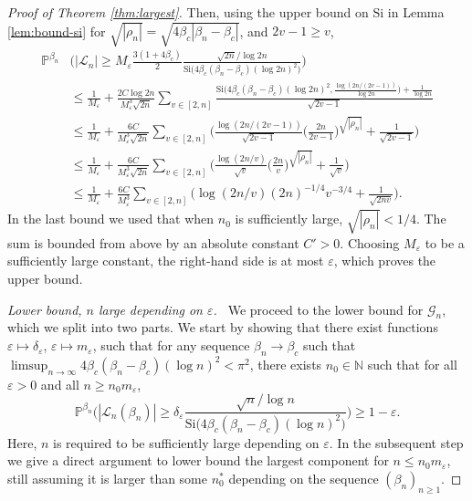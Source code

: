 \documentclass[a4paper, a4wide, 10pt, reqno]{amsart}
\theoremstyle{plain}
\theoremstyle{definition}
\numberwithin{equation}{section}
\newcommand{\N}{{\mathbb N}}
\newcommand{\Prob}{\mathbb{P}}
\newcommand\eps{\varepsilon}
\newcommand{\sG}{{\mathscr G}}
\newcommand{\sL}{{\mathscr L}}
\newcommand{\Si}{{\mathrm{Si}}}
\begin{document}
\begin{proof}[Proof of Theorem \ref{thm:largest}]
Then, using the upper bound on $\Si$ in Lemma \ref{lem:bound-si} for $\sqrt{|\rho_n|}=\sqrt{4\beta_c|\beta_n-\beta_c|}$, and $2v-1\ge v$,
\begin{equation}\nonumber
\begin{aligned}
\Prob^{\beta_n}&\bigg(|\sL_n| \ge M_\varepsilon \frac{3(1+4\beta_c)}2\frac{\sqrt{2n}/\log 2n}{\Si\big(4\beta_c(\beta_n-\beta_c)(\log 2n)^2\big)}\bigg)\\&\le \frac{1}{M_\varepsilon} + \frac{2C\log 2n}{M_\varepsilon^3\sqrt{2n}} \sum_{v\in[2,n]}\frac{\Si\big(4\beta_c(\beta_n-\beta_c)(\log 2n)^2, \frac{\log (2n/(2v-1))}{\log 2n}\big) + \frac{1}{\log 2n}}{\sqrt{2v-1}}\\
&\le 
\frac{1}{M_\varepsilon} + \frac{6C}{M_\varepsilon^3\sqrt{2n}} \sum_{v\in[2,n]}\Big(\frac{\log(2n/(2v-1))}{\sqrt{2v-1}}\Big(\frac{2n}{2v-1}\Big)^{\sqrt{|\rho_n|}} +\frac{1}{\sqrt{2v-1}}\Big) \\
&\le 
\frac{1}{M_\varepsilon} + \frac{6C}{M_\varepsilon^3\sqrt{2n}} \sum_{v\in[2,n]}\Big(\frac{\log(2n/v)}{\sqrt{v}}\Big(\frac{2n}{v}\Big)^{\sqrt{|\rho_n|}} +\frac{1}{\sqrt{v}}\Big) \\
&\le 
\frac{1}{M_\varepsilon} + \frac{6C}{M_\varepsilon^3}\sum_{v\in[2,n]}\Big(\log(2n/v)(2n)^{-1/4} v^{-3/4}+\frac{1}{\sqrt{2nv}}\Big)
.
\end{aligned}
\end{equation}%
In the last bound we used that when $n_0$ is sufficiently large, $\sqrt{|\rho_n|}<1/4$. The sum is bounded from above by an absolute constant $C'>0$. Choosing $M_\varepsilon$ to be a sufficiently large constant, the right-hand side is at most $\varepsilon$, which proves the upper bound.

\medskip
\noindent\emph{Lower bound, $n$ large depending on $\eps$.\ }
We proceed to the lower bound for $\sG_n$, which we split into two parts. We start by showing that
there exist functions $\varepsilon\mapsto\delta_\varepsilon$, $\varepsilon\mapsto m_\varepsilon$, such that for any sequence $\beta_n\to\beta_c$ such that $\limsup_{n\to\infty}4\beta_c(\beta_n-\beta_c)(\log n)^2<\pi^2$, there exists $n_0\in\N$ such that for all $\varepsilon>0$ and all $n\ge n_0m_\varepsilon$, 
\begin{equation}\label{eq:lower-pr1}
    \Prob^{\beta_n}\bigg(|\sL_n(\beta_n)|\ge \delta_\varepsilon \frac{\sqrt{n}/\log n}{\Si\big(4\beta_c(\beta_n-\beta_c)(\log n)^2\big)}\bigg) \ge 1-\varepsilon.
\end{equation}
Here, $n$ is required to be sufficiently large depending on $\eps$. In the subsequent step we give a direct argument to lower bound the largest component for $n\le n_0m_\eps$, still assuming it is larger than some $n_0^*$ depending on the sequence $(\beta_n)_{n\ge1}$.\smallskip


\end{proof}
\end{document}
